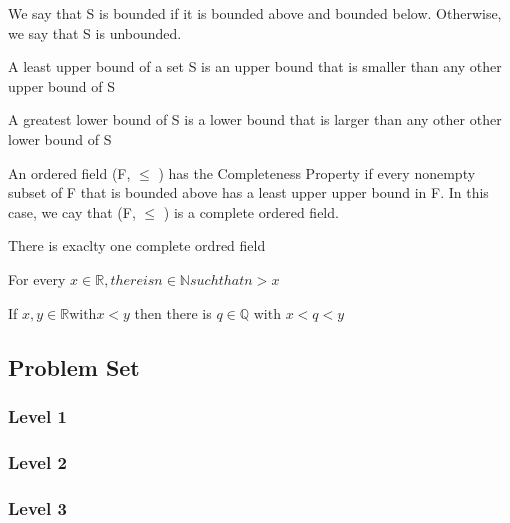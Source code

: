 \documentclass{article}
\begin{document}
\begin{definition}
    We say that S is bounded if it is bounded above and bounded below. Otherwise,
    we say that S is unbounded.
\end{definition}

\begin{definition}[Supremum]
    A least upper bound of a set S is an upper bound that is smaller than any
    other upper bound of S
\end{definition}

\begin{definition}[Infimum]
    A greatest lower bound of S is a lower bound that is larger than any other
    other lower bound of S
\end{definition}

\begin{definition}
    An ordered field (F, $\leq$ ) has the Completeness Property if every nonempty
    subset of F that is bounded above has a least upper upper bound in F. In this
    case, we cay that (F, $\leq$ ) is a complete ordered field.
\end{definition}

\begin{theorem}
    There is exaclty one complete ordred field
\end{theorem}

\begin{theorem}
    For every $x \in \mathbb{R}, there is n \in \mathbb{N} such that n > x $
\end{theorem}

\begin{theorem}
    If $x, y \in \mathbb{R} \text{with} x<y$ then there is $q \in \mathbb{Q}
    \text{ with } x<q<y $
\end{theorem}

\subsection{Problem Set}
\subsubsection{Level 1}
\subsubsection{Level 2}
\subsubsection{Level 3}
\end{document}
